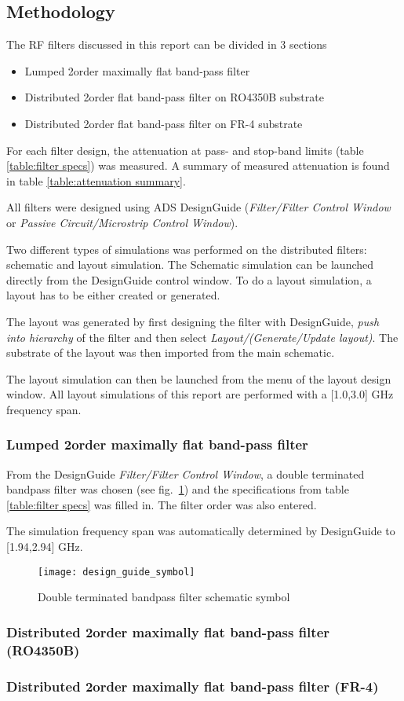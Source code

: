 \documentclass[report.tex]{subfiles}
\begin{document}
\subsection{Methodology}
The RF filters discussed in this report can be divided in 3 sections
\begin{itemize}
    \item Lumped 2\nd order maximally flat band-pass filter
    \item Distributed 2\nd order flat band-pass filter on RO4350B substrate
    \item Distributed 2\nd order flat band-pass filter on FR-4 substrate
\end{itemize}
For each filter design, the attenuation at pass- and stop-band limits (table \ref{table:filter specs}) was measured. A summary of measured attenuation is found in table \ref{table:attenuation summary}.

All filters were designed using ADS DesignGuide (\emph{Filter/Filter Control Window} or \emph{Passive Circuit/Microstrip Control Window}).

Two different types of simulations was performed on the distributed filters: schematic and layout simulation. The Schematic simulation can be launched directly from the DesignGuide control window. To do a layout simulation, a layout has to be either created or generated.

The layout was generated by first designing the filter with DesignGuide, \emph{push into hierarchy} of the filter and then select \emph{Layout/(Generate/Update layout)}. The substrate of the layout was then imported from the main schematic.

The layout simulation can then be launched from the menu of the layout design window. All layout simulations of this report are performed with a [1.0,3.0] GHz frequency span.

\subsubsection{Lumped 2\nd order maximally flat band-pass filter}
From the DesignGuide \emph{Filter/Filter Control Window}, a double terminated bandpass filter was chosen (see fig.~\ref{fig:Filter A}) and the specifications from table \ref{table:filter specs} was filled in. The filter order was also entered. 

The simulation frequency span was automatically determined by DesignGuide to [1.94,2.94] GHz.

\begin{figure}[h]
    \centering
    \texttt{[image: design\_guide\_symbol]}
    \caption{Double terminated bandpass filter schematic symbol}
    \label{fig:Filter A}
\end{figure}

\subsubsection{Distributed 2\nd order maximally flat band-pass filter (RO4350B)}


\subsubsection{Distributed 2\nd order maximally flat band-pass filter (FR-4)}
\end{document}
